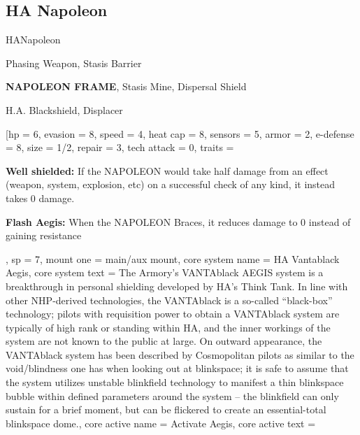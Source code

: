 \subsection{HA Napoleon}

\begin{mech}{HA}{Napoleon}


\begin{license}
\item Phasing Weapon, Stasis Barrier
\item \textbf{NAPOLEON FRAME}, Stasis Mine, Dispersal Shield
\item H.A. Blackshield, Displacer
\end{license}

\frameBox
[hp = 6,
evasion = 8,
speed = 4,
heat cap = 8,
sensors = 5,
armor = 2,
e-defense = 8,
size = 1/2,
repair = 3,
tech attack = 0,
traits = {\textbf{Well shielded:} If the NAPOLEON would take half damage from an effect (weapon, system, explosion, etc) on a successful check of any kind, it instead takes 0 damage.

\textbf{Flash Aegis:} When the NAPOLEON Braces, it reduces damage to 0 instead of gaining resistance},
sp = 7,
mount one = main/aux mount,
core system name = HA Vantablack Aegis,
core system text = {The Armory’s VANTAblack AEGIS system is a breakthrough in personal shielding developed by HA’s Think Tank. In line with other NHP-derived technologies, the VANTAblack is a so-called “black-box” technology; pilots with requisition power to obtain a VANTAblack system are typically of high rank or standing within HA, and the inner workings of the system are not known to the public at large. On outward appearance, the VANTAblack system has been described by Cosmopolitan pilots as similar to the void/blindness one has when looking out at blinkspace; it is safe to assume that the system utilizes unstable blinkfield technology to manifest a thin blinkspace bubble within defined parameters around the system -- the blinkfield can only sustain for a brief moment, but can be flickered to create an essential-total blinkspace dome.},
core active name = Activate Aegis,
core active text ={\QuickAction

}
\end{mech}
